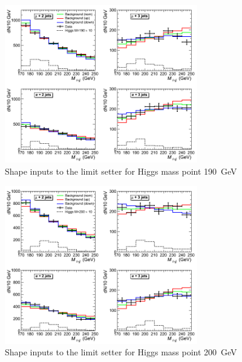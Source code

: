 \clearpage

\begin{figure}[h!]
\begin{center}
\includegraphics[width=0.75\textwidth]{plots/2012_SHAPES/hww-histo-shapes-M=190}
\caption{Shape inputs to the limit setter for Higgs mass point 190~GeV}
\end{center}
\end{figure}
\begin{figure}[h!]
\begin{center}
\includegraphics[width=0.75\textwidth]{plots/2012_SHAPES/hww-histo-shapes-M=200}
\caption{Shape inputs to the limit setter for Higgs mass point 200~GeV}
\end{center}
\end{figure}

\clearpage


